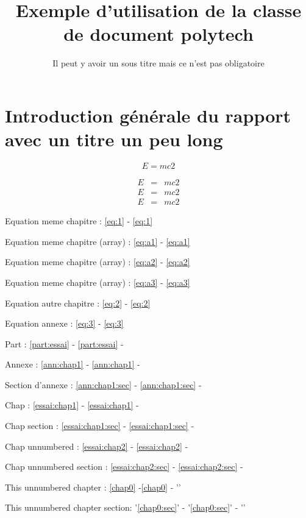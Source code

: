 \documentclass{polytech/polytech}
\title{Exemple d'utilisation de la classe de document \mbox{polytech}}
\subtitle{Il peut y avoir un sous titre mais ce n'est pas obligatoire}
\begin{document}
             
\chapter*[Titre court pour l'entête]{Introduction générale du rapport avec un titre un peu long}

\label{sec:0}    
\label{chap0}    

\begin{equation}
\label{eq:1} 
E=mc2
\end{equation}     

\begin{eqnarray}
\label{eq:a1}
E&=&mc2\\
\label{eq:a2}   
E&=&mc2\\
\label{eq:a3}
E&=&mc2 
\end{eqnarray}          
 
Equation meme chapitre : \autoref{eq:1} - \eqref{eq:1}
 
Equation meme chapitre (array) : \autoref{eq:a1} - \eqref{eq:a1}

Equation meme chapitre (array) : \autoref{eq:a2} - \eqref{eq:a2}

Equation meme chapitre (array) : \autoref{eq:a3} - \eqref{eq:a3}

Equation autre chapitre : \autoref{eq:2} - \eqref{eq:2}


Equation annexe :  \autoref{eq:3}   - \eqref{eq:3}  
      
Part : \ref{part:essai} - \autoref{part:essai} -             
       
Annexe : \ref{ann:chap1} - \autoref{ann:chap1} -               
 
Section d'annexe : \ref{ann:chap1:sec} - \autoref{ann:chap1:sec} -           
 
 Chap : \ref{essai:chap1} - \autoref{essai:chap1} - 
            
Chap section : \ref{essai:chap1:sec} - \autoref{essai:chap1:sec} - 


Chap unnumbered : \ref{essai:chap2} - \autoref{essai:chap2} -        

Chap unnumbered section : \ref{essai:chap2:sec} - \autoref{essai:chap2:sec} - 

This unnumbered chapter : \ref{chap0} -\autoref{chap0} - ''  
  
This unnumbered chapter section: '\ref{chap0:sec}' - '\autoref{chap0:sec}' - ''  
\end{document}
